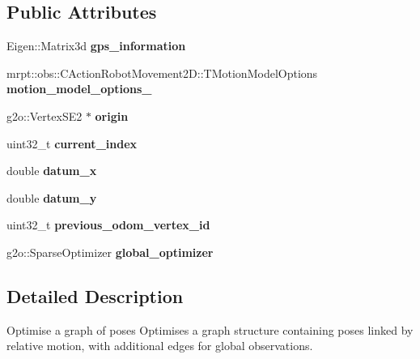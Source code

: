 \subsection*{Public Attributes}
\begin{DoxyCompactItemize}
\item 
\mbox{\label{classGraphOptimiser_ad1b6ee44cbaa3b3d2817d62acbdfd7d6}} 
Eigen\+::\+Matrix3d {\bfseries gps\+\_\+information}
\item 
\mbox{\label{classGraphOptimiser_a1fae664a0b8570d2f88392662dde3710}} 
mrpt\+::obs\+::\+C\+Action\+Robot\+Movement2\+D\+::\+T\+Motion\+Model\+Options {\bfseries motion\+\_\+model\+\_\+options\+\_\+}
\item 
\mbox{\label{classGraphOptimiser_a6247045a0b2757e02690a8e98ef71b03}} 
g2o\+::\+Vertex\+S\+E2 $\ast$ {\bfseries origin}
\item 
\mbox{\label{classGraphOptimiser_ab1f61ad8e5e6c8bada0263942b1b068c}} 
uint32\+\_\+t {\bfseries current\+\_\+index}
\item 
\mbox{\label{classGraphOptimiser_a240a79573703fa7c1c6ab1ddb7dfc601}} 
double {\bfseries datum\+\_\+x}
\item 
\mbox{\label{classGraphOptimiser_a36a019181bf4711ba275398413eff289}} 
double {\bfseries datum\+\_\+y}
\item 
\mbox{\label{classGraphOptimiser_a6eb72ad8bf9d692c2b0daf64f45c8cce}} 
uint32\+\_\+t {\bfseries previous\+\_\+odom\+\_\+vertex\+\_\+id}
\item 
\mbox{\label{classGraphOptimiser_ad4772e6892e2c1cfca68bfbdce804c6e}} 
g2o\+::\+Sparse\+Optimizer {\bfseries global\+\_\+optimizer}
\end{DoxyCompactItemize}


\subsection{Detailed Description}
Optimise a graph of poses Optimises a graph structure containing poses linked by relative motion, with additional edges for global observations. 

